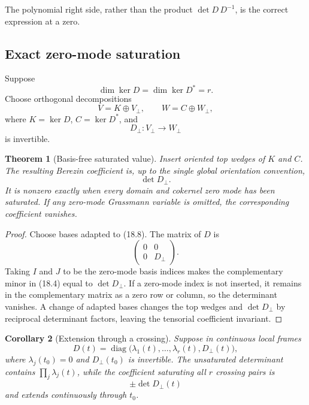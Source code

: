 \documentclass[11pt]{article}
\newtheorem{theorem}{Theorem}[section]
\newtheorem{corollary}[theorem]{Corollary}
\begin{document}
The polynomial right side, rather than the product
\(\det D\,D^{-1}\), is the correct expression at a zero.

\subsection{Exact zero-mode saturation}

Suppose
\[
 \dim\ker D=\dim\ker D^*=r.
 \tag{18.7}
\]
Choose orthogonal decompositions
\[
 V=K\oplus V_\perp,\qquad
 W=C\oplus W_\perp,
 \tag{18.8}
\]
where \(K=\ker D\), \(C=\ker D^*\), and
\[
 D_\perp:V_\perp\longrightarrow W_\perp
 \tag{18.9}
\]
is invertible.

\begin{theorem}[Basis-free saturated value]
\label{thm:v11v18-saturated-value}
Insert oriented top wedges of \(K\) and \(C\).  The resulting Berezin
coefficient is, up to the single global orientation convention,
\[
 \det D_\perp.
 \tag{18.10}
\]
It is nonzero exactly when every domain and cokernel zero mode has been
saturated.  If any zero-mode Grassmann variable is omitted, the
corresponding coefficient vanishes.
\end{theorem}

\begin{proof}
Choose bases adapted to (18.8).  The matrix of \(D\) is
\[
 \begin{pmatrix}
 0&0\\
 0&D_\perp
 \end{pmatrix}.
\]
Taking \(I\) and \(J\) to be the zero-mode basis indices makes the
complementary minor in (18.4) equal to \(\det D_\perp\).  If a zero-mode
index is not inserted, it remains in the complementary matrix as a zero
row or column, so the determinant vanishes.  A change of adapted bases
changes the top wedges and \(\det D_\perp\) by reciprocal determinant
factors, leaving the tensorial coefficient invariant.
\end{proof}

\begin{corollary}[Extension through a crossing]
\label{cor:v11v18-crossing}
Suppose in continuous local frames
\[
 D(t)=
 \operatorname{diag}
 \bigl(\lambda_1(t),\ldots,\lambda_r(t),D_\perp(t)\bigr),
 \tag{18.11}
\]
where \(\lambda_j(t_0)=0\) and \(D_\perp(t_0)\) is invertible.  The
unsaturated determinant contains
\(\prod_j\lambda_j(t)\), while the coefficient saturating all \(r\)
crossing pairs is
\[
 \pm\det D_\perp(t)
 \tag{18.12}
\]
and extends continuously through \(t_0\).
\end{corollary}
\end{document}
